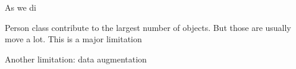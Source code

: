 As we di

Person class contribute to the largest number of objects. But those are usually move a lot. This is a major limitation

Another limitation: data augmentation
